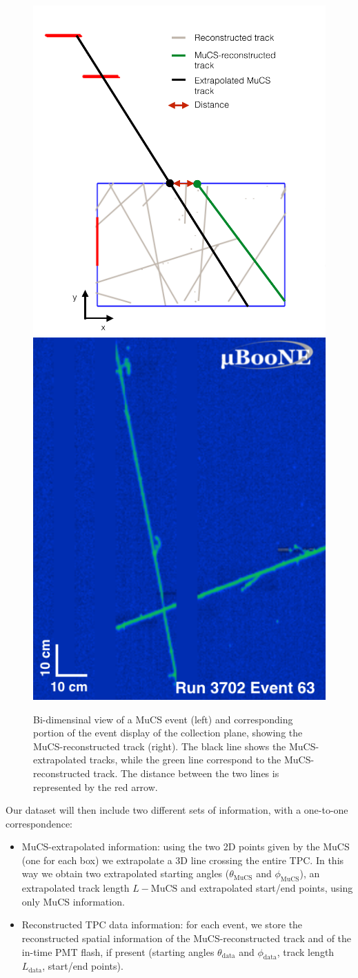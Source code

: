 \documentclass[a4paper]{scrartcl}
\begin{document}
\begin{figure}[htbp]
  \begin{center}
  \includegraphics[width=0.45\linewidth]{figures/evd.pdf}  \vspace{1.5em}\includegraphics[width=0.35\linewidth]{figures/evd_display.png}

  \caption{Bi-dimensinal view of a MuCS event (left) and corresponding portion of the event display of the collection plane, showing the MuCS-reconstructed track (right). The black line shows the MuCS-extrapolated tracks, while the green line correspond to the MuCS-reconstructed track. The distance between the two lines is represented by the red arrow.} \label{fig:evd}
\end{center}
\end{figure}

Our dataset will then include two different sets of information, with a one-to-one correspondence:
\begin{itemize}
  \item MuCS-extrapolated information: using the two 2D points given by the MuCS (one for each box) we extrapolate a 3D line crossing the entire TPC. In this way we obtain two extrapolated starting angles ($\theta_{\textrm{MuCS}}$ and $\phi_{\textrm{MuCS}}$), an extrapolated track length $L-{\textrm{MuCS}}$ and extrapolated start/end points, using only MuCS information.
  \item Reconstructed TPC data information: for each event, we store the reconstructed spatial information of the MuCS-reconstructed track and of the in-time PMT flash, if present (starting angles $\theta_{\textrm{data}}$ and $\phi_{\textrm{data}}$, track length $L_{\textrm{data}}$, start/end points).
\end{itemize}
\end{document}

